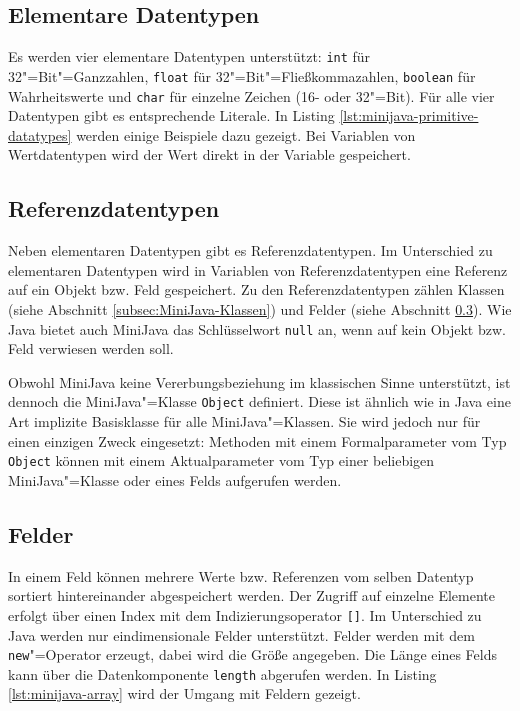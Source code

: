 \pagebreak
\subsection{Elementare Datentypen}

Es werden vier elementare Datentypen unterstützt: \lstinline{int} für 32"=Bit"=Ganzzahlen, \lstinline{float} für 32"=Bit"=Fließkommazahlen, \lstinline{boolean} für Wahrheitswerte und \lstinline{char} für einzelne Zeichen (16- oder 32"=Bit). Für alle vier Datentypen gibt es entsprechende Literale. In Listing \ref{lst:minijava-primitive-datatypes} werden einige Beispiele dazu gezeigt. Bei Variablen von Wertdatentypen wird der Wert direkt in der Variable gespeichert.



\subsection{Referenzdatentypen}

Neben elementaren Datentypen gibt es Referenzdatentypen. Im Unterschied zu elementaren Datentypen wird in Variablen von Referenzdatentypen eine Referenz auf ein Objekt bzw. Feld gespeichert. Zu den Referenzdatentypen zählen Klassen (siehe Abschnitt \ref{subsec:MiniJava-Klassen}) und Felder (siehe Abschnitt \ref{subsec:MiniJava-Felder}). Wie Java bietet auch MiniJava das Schlüsselwort \lstinline{null} an, wenn auf kein Objekt bzw. Feld verwiesen werden soll.

Obwohl MiniJava keine Vererbungsbeziehung im klassischen Sinne unterstützt, ist dennoch die MiniJava"=Klasse \lstinline{Object} definiert. Diese ist ähnlich wie in Java eine Art implizite Basisklasse für alle MiniJava"=Klassen. Sie wird jedoch nur für einen einzigen Zweck eingesetzt: Methoden mit einem Formalparameter vom Typ \lstinline{Object} können mit einem Aktualparameter vom Typ einer beliebigen MiniJava"=Klasse oder eines Felds aufgerufen werden.

\subsection{Felder}
\label{subsec:MiniJava-Felder}

In einem Feld können mehrere Werte bzw. Referenzen vom selben Datentyp sortiert hintereinander abgespeichert werden. Der Zugriff auf einzelne Elemente erfolgt über einen Index mit dem Indizierungsoperator \lstinline{[]}. Im Unterschied zu Java werden nur eindimensionale Felder unterstützt. Felder werden mit dem \lstinline{new}"=Operator erzeugt, dabei wird die Größe angegeben. Die Länge eines Felds kann über die Datenkomponente \lstinline{length} abgerufen werden. In Listing \ref{lst:minijava-array} wird der Umgang mit Feldern gezeigt.

